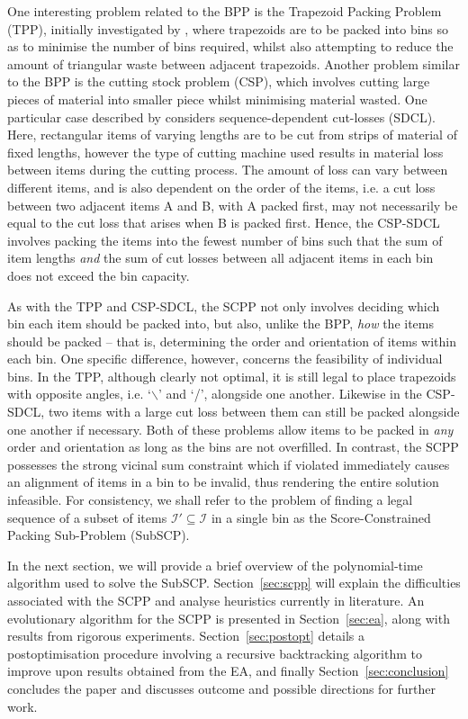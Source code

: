 \documentclass[authoryear]{elsarticle}
\begin{document}
\noindent One interesting problem related to the BPP is the Trapezoid Packing Problem (TPP), initially investigated by \citet{lewis2011}, where trapezoids are to be packed into bins so as to minimise the number of bins required, whilst also attempting to reduce the amount of triangular waste between adjacent trapezoids. Another problem similar to the BPP is the cutting stock problem (CSP), which involves cutting large pieces of material into smaller piece whilst minimising material wasted. One particular case described by \citet{garraffa2016} considers sequence-dependent cut-losses (SDCL). Here, rectangular items of varying lengths are to be cut from strips of material of fixed lengths, however the type of cutting machine used results in material loss between items during the cutting process. The amount of loss can vary between different items, and is also dependent on the order of the items, i.e. a cut loss between two adjacent items A and B, with A packed first, may not necessarily be equal to the cut loss that arises when B is packed first. Hence, the CSP-SDCL involves packing the items into the fewest number of bins such that the sum of item lengths \emph{and} the sum of cut losses between all adjacent items in each bin does not exceed the bin capacity.

As with the TPP and CSP-SDCL, the SCPP not only involves deciding which bin each item should be packed into, but also, unlike the BPP, \emph{how} the items should be packed -- that is, determining the order and orientation of items within each bin. One specific difference, however, concerns the feasibility of individual bins. In the TPP, although clearly not optimal, it is still legal to place trapezoids with opposite angles, i.e. `$\backslash$' and `/', alongside one another. Likewise in the CSP-SDCL, two items with a large cut loss between them can still be packed alongside one another if necessary. Both of these problems allow items to be packed in \emph{any} order and orientation as long as the bins are not overfilled. In contrast, the SCPP possesses the strong vicinal sum constraint which if violated immediately causes an alignment of items in a bin to be invalid, thus rendering the entire solution infeasible. For consistency, we shall refer to the problem of finding a legal sequence of a subset of items $\mathcal{I}' \subseteq \mathcal{I}$ in a single bin as the Score-Constrained Packing Sub-Problem (SubSCP).

In the next section, we will provide a brief overview of the polynomial-time algorithm used to solve the SubSCP. Section~\ref{sec:scpp} will explain the difficulties associated with the SCPP and analyse heuristics currently in literature. An evolutionary algorithm for the SCPP is presented in Section~\ref{sec:ea}, along with results from rigorous experiments. Section~\ref{sec:postopt} details a postoptimisation procedure involving a recursive backtracking algorithm to improve upon results obtained from the EA, and finally Section~\ref{sec:conclusion} concludes the paper and discusses outcome and possible directions for further work.
\end{document}
